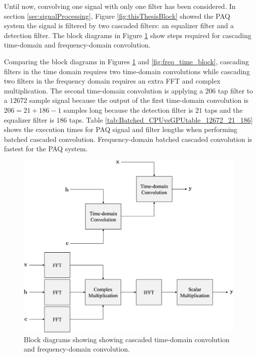 Until now, convolving one signal with only one filter has been considered.
In section \ref{sec:signalProcessing}, Figure \ref{fig:thisThesisBlock} showed the PAQ system the signal is filtered by two cascaded filters: 
an equalizer filter and a detection filter.
The block diagrams in Figure \ref{fig:freq_time_block_cascade} show steps required for cascading time-domain and frequency-domain convolution.

Comparing the block diagrams in Figures \ref{fig:freq_time_block_cascade} and \ref{fig:freq_time_block}, cascading filters in the time domain requires two time-domain convolutions while
cascading two filters in the frequency domain requires an extra FFT and complex multiplication.
The second time-domain convolution is applying a $206$ tap filter to a $12672$ sample signal because the output of the first time-domain convolution is $206 = 21 + 186 - 1$ samples long because the detection filter is $21$ taps and the equalizer filter is $186$ taps.
Table \ref{tab:Batched_CPUvsGPUtable_12672_21_186} shows the execution times for PAQ signal and filter lengths when performing batched cascaded convolution.
Frequency-domain batched cascaded convolution is fastest for the PAQ system.
\begin{figure}
	\centering\includegraphics[width=10.28in/100*55]{figures/gpu_convolution/CascadeConvBlock.pdf}
	\caption{Block diagrams showing showing cascaded time-domain convolution and frequency-domain convolution.}
	\label{fig:freq_time_block_cascade}
\end{figure}
